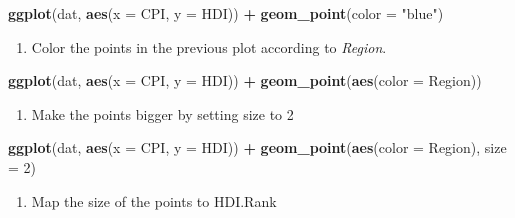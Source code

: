 \documentclass[]{book}
\newenvironment{Shaded}{\begin{snugshade}}{\end{snugshade}}
\newcommand{\KeywordTok}[1]{\textcolor[rgb]{0.13,0.29,0.53}{\textbf{#1}}}
\newcommand{\DataTypeTok}[1]{\textcolor[rgb]{0.13,0.29,0.53}{#1}}
\newcommand{\DecValTok}[1]{\textcolor[rgb]{0.00,0.00,0.81}{#1}}
\newcommand{\StringTok}[1]{\textcolor[rgb]{0.31,0.60,0.02}{#1}}
\newcommand{\OperatorTok}[1]{\textcolor[rgb]{0.81,0.36,0.00}{\textbf{#1}}}
\newcommand{\NormalTok}[1]{#1}
\providecommand{\tightlist}{%
  \setlength{\itemsep}{0pt}\setlength{\parskip}{0pt}}
\begin{document}
\begin{Shaded}
\begin{Highlighting}[]
\KeywordTok{ggplot}\NormalTok{(dat, }\KeywordTok{aes}\NormalTok{(}\DataTypeTok{x =}\NormalTok{ CPI, }\DataTypeTok{y =}\NormalTok{ HDI)) }\OperatorTok{+}
\StringTok{  }\KeywordTok{geom_point}\NormalTok{(}\DataTypeTok{color =} \StringTok{"blue"}\NormalTok{)}
\end{Highlighting}
\end{Shaded}

\begin{enumerate}
\def\labelenumi{\arabic{enumi}.}
\setcounter{enumi}{2}
\tightlist
\item
  Color the points in the previous plot according to \emph{Region}.
\end{enumerate}

\begin{Shaded}
\begin{Highlighting}[]
\KeywordTok{ggplot}\NormalTok{(dat, }\KeywordTok{aes}\NormalTok{(}\DataTypeTok{x =}\NormalTok{ CPI, }\DataTypeTok{y =}\NormalTok{ HDI)) }\OperatorTok{+}
\StringTok{  }\KeywordTok{geom_point}\NormalTok{(}\KeywordTok{aes}\NormalTok{(}\DataTypeTok{color =}\NormalTok{ Region))}
\end{Highlighting}
\end{Shaded}

\begin{enumerate}
\def\labelenumi{\arabic{enumi}.}
\setcounter{enumi}{3}
\tightlist
\item
  Make the points bigger by setting size to 2
\end{enumerate}

\begin{Shaded}
\begin{Highlighting}[]
\KeywordTok{ggplot}\NormalTok{(dat, }\KeywordTok{aes}\NormalTok{(}\DataTypeTok{x =}\NormalTok{ CPI, }\DataTypeTok{y =}\NormalTok{ HDI)) }\OperatorTok{+}
\StringTok{  }\KeywordTok{geom_point}\NormalTok{(}\KeywordTok{aes}\NormalTok{(}\DataTypeTok{color =}\NormalTok{ Region), }\DataTypeTok{size =} \DecValTok{2}\NormalTok{)}
\end{Highlighting}
\end{Shaded}

\begin{enumerate}
\def\labelenumi{\arabic{enumi}.}
\setcounter{enumi}{4}
\tightlist
\item
  Map the size of the points to HDI.Rank
\end{enumerate}
\end{document}
